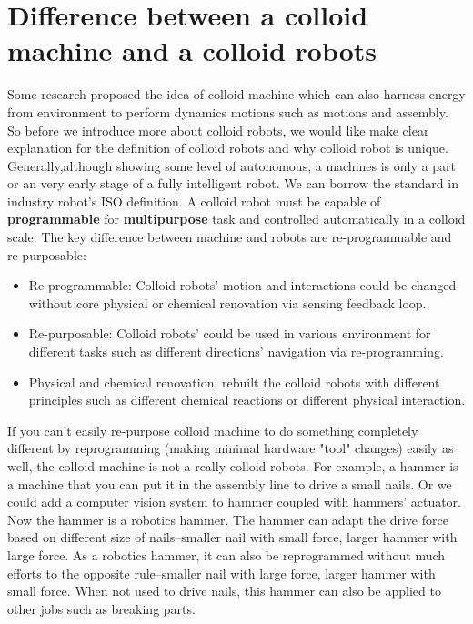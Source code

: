 \section{Difference between a colloid machine and a colloid robots}
 Some research proposed the idea of colloid machine which can also harness energy from environment to perform dynamics motions such as motions and assembly.\cite{spellings2015shape,van2016spatiotemporal} 
 So before we introduce more about colloid robots, we would like make clear explanation for the definition of  colloid robots and why colloid robot is unique. Generally,although showing some level of autonomous, a machines is only a part or an very early stage  of a fully intelligent robot.\cite{whitesides2018soft} We can borrow the standard in industry robot's ISO definition.\cite{virk2008iso}
A colloid robot must be capable of \textbf{programmable} for \textbf{multipurpose} task and controlled automatically in a colloid scale.  The key difference between machine and robots are re-programmable and re-purposable:
\begin{itemize}
    \item Re-programmable: Colloid robots' motion and interactions could be changed without core physical or chemical renovation via sensing feedback loop.
    \item Re-purposable: Colloid robots' could be used in various environment for different tasks  such as different directions' navigation via re-programming.
    \item Physical  and chemical renovation:  rebuilt the colloid robots with different principles such as different chemical reactions or different physical interaction.
\end{itemize}
If you can't easily re-purpose colloid machine to do something completely different by reprogramming (making minimal hardware "tool" changes) easily as well, the colloid machine is not a really colloid robots.
For example, a hammer is a machine that you can put it in the assembly line to drive a small nails.   Or we could add a computer vision system to hammer coupled with hammers' actuator. Now the hammer is a robotics hammer. The hammer can adapt the drive force based on different size of nails--smaller nail with small force, larger hammer with large force. As a robotics hammer, it can also be reprogrammed without much efforts to the opposite rule--smaller nail with large force, larger hammer with small force. When not used to drive nails, this hammer can also be applied to other jobs such as breaking parts.


